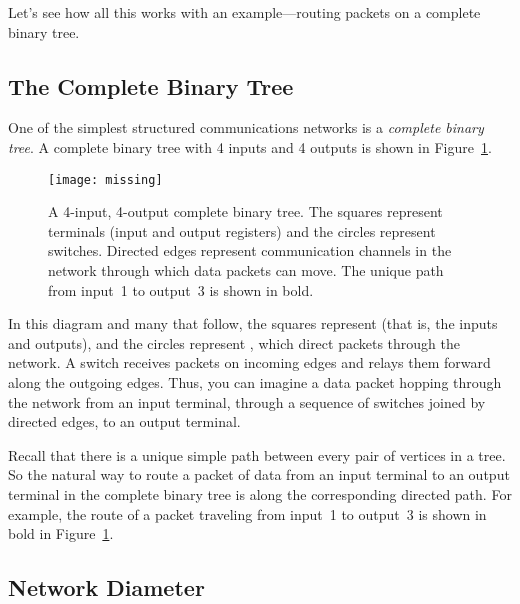 Let's see how all this works with an example---routing packets on a
complete binary tree.

\subsection{The Complete Binary Tree}

One of the simplest structured communications networks is a
\emph{complete binary tree}.  A complete binary tree with 4 inputs and
4 outputs is shown in Figure~\ref{fig:6EH}.

\begin{figure}

\missinggraphic

\texttt{[image: missing]}

\caption{A 4-input, 4-output complete binary tree.  The squares
  represent terminals (input and output registers) and the circles
  represent switches.  Directed edges represent communication channels
  in the network through which data packets can move.  The unique path
  from input~1 to output~3 is shown in bold.}

\label{fig:6EH}

\end{figure}

In this diagram and many that follow, the squares represent
 (that is, the inputs and outputs), and the circles
represent , which direct packets through the network.
A switch receives packets on incoming edges and relays them forward
along the outgoing edges.  Thus, you can imagine a data packet hopping
through the network from an input terminal, through a sequence of
switches joined by directed edges, to an output terminal.

Recall that there is a unique simple path between every pair of
vertices in a tree.  So the natural way to route a packet of data from
an input terminal to an output terminal in the complete binary tree is
along the corresponding directed path.  For example, the route of a
packet traveling from input~1 to output~3 is shown in bold in
Figure~\ref{fig:6EH}.

\subsection{Network Diameter}

